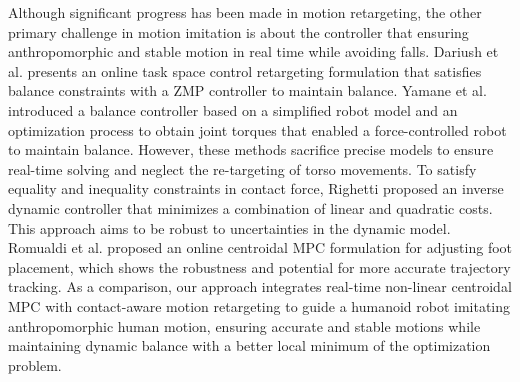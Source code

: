 \documentclass[a4paper, 10pt, conference]{ieeeconf}      %
\begin{document}
Although significant progress has been made in motion retargeting, the other primary challenge in motion imitation is about the controller that ensuring anthropomorphic and stable motion in real time while avoiding falls. Dariush et al. \cite{c14}presents an online task space control retargeting formulation that satisfies balance constraints with a ZMP controller to maintain balance. Yamane et al. \cite{c23} introduced a balance controller based on a simplified robot model and an optimization process to obtain joint torques that enabled a force-controlled robot to maintain balance. However, these methods sacrifice precise models to ensure real-time solving and neglect the re-targeting of torso movements. To satisfy equality and inequality constraints in contact force, Righetti \cite{c24} proposed an inverse dynamic controller that minimizes a combination of linear and quadratic costs. This approach aims to be robust to uncertainties in the dynamic model. Romualdi et al. \cite{c18} proposed an online centroidal MPC formulation for adjusting foot placement, which shows the robustness and potential for more accurate trajectory tracking. As a comparison, our approach integrates real-time non-linear centroidal MPC with contact-aware motion retargeting to guide a humanoid robot imitating anthropomorphic human motion, ensuring accurate and stable motions while maintaining dynamic balance with a better local minimum of the optimization problem.
\end{document}
